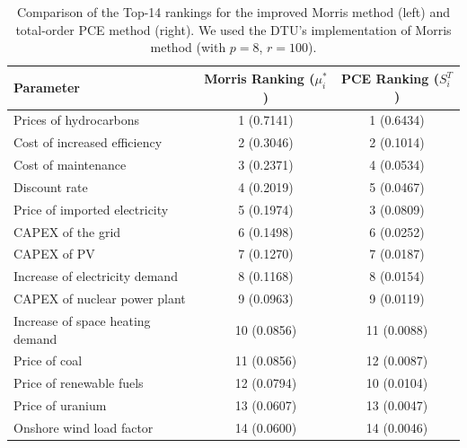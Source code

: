 \documentclass[12pt,a4paper]{article}
\begin{document}
\begin{table}[htbp]
	\caption{Comparison of the Top-14 rankings for the improved Morris method (left) and total-order PCE method (right). We used the DTU's implementation of Morris method \cite{MorrisCodeDTU} (with $p=8$, $r=100$). }
    \label{tab:GSA:Comparison}
    \centering
    \begin{tabular}{lcc}
    \hline
		\textbf{Parameter} & \textbf{Morris Ranking} ($\mu^*_{i}$) & \textbf{PCE Ranking} ($S_i^T$) \\
        \hline
        Prices of hydrocarbons & 1 (0.7141) & 1 (0.6434) \\
        Cost of increased efficiency & 2 (0.3046) & 2 (0.1014) \\
        Cost of maintenance & 3 (0.2371) & 4 (0.0534) \\
        Discount rate & 4 (0.2019) & 5 (0.0467) \\
        Price of imported electricity & 5 (0.1974) & 3 (0.0809) \\
        CAPEX of the grid & 6 (0.1498) & 6 (0.0252) \\
        CAPEX of PV & 7 (0.1270) & 7 (0.0187) \\
        Increase of electricity demand & 8 (0.1168) & 8 (0.0154) \\
        CAPEX of nuclear power plant & 9 (0.0963) & 9 (0.0119) \\
        Increase of space heating demand & 10 (0.0856) & 11 (0.0088) \\
        Price of coal & 11 (0.0856) & 12 (0.0087)\\
        Price of renewable fuels & 12 (0.0794) & 10 (0.0104)\\
        Price of uranium & 13 (0.0607) & 13 (0.0047)\\
        Onshore wind load factor & 14 (0.0600) & 14 (0.0046)\\
       \hline
    \end{tabular}
\end{table}
\end{document}
